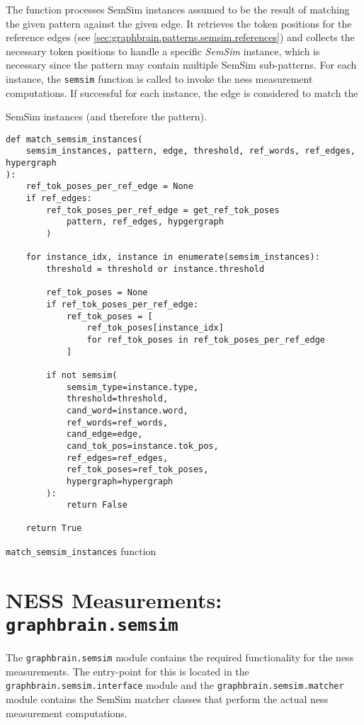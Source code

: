 \documentclass[11pt]{scrreprt}
\begin{document}
The function processes SemSim instances assumed to be the result of matching the given pattern against the given edge. It retrieves the token positions for the reference edges (see \cref{sec:graphbrain.patterns.semsim.references}) and collects the necessary token positions to handle a specific \textit{SemSim} instance, which is necessary since the pattern may contain multiple SemSim  sub-patterns. For each instance, the \texttt{semsim} function is called to invoke the \gls{ness} measurement computations. If successful for each instance, the edge is considered to match the {SemSim instances (and therefore the pattern).
 
\begin{pseudo}
\begin{lstlisting}
def match_semsim_instances(
    semsim_instances, pattern, edge, threshold, ref_words, ref_edges, hypergraph
):
    ref_tok_poses_per_ref_edge = None
    if ref_edges:
        ref_tok_poses_per_ref_edge = get_ref_tok_poses
            pattern, ref_edges, hypgergraph
        ) 
   
    for instance_idx, instance in enumerate(semsim_instances):
        threshold = threshold or instance.threshold

        ref_tok_poses = None
        if ref_tok_poses_per_ref_edge:
            ref_tok_poses = [
                ref_tok_poses[instance_idx]
                for ref_tok_poses in ref_tok_poses_per_ref_edge
            ]

        if not semsim(
            semsim_type=instance.type,
            threshold=threshold,
            cand_word=instance.word,
            ref_words=ref_words,
            cand_edge=edge,
            cand_tok_pos=instance.tok_pos,
            ref_edges=ref_edges,
            ref_tok_poses=ref_tok_poses,
            hypergraph=hypergraph
        ):
            return False

    return True
\end{lstlisting}
\caption{\texttt{match\_semsim\_instances} function}
\label{psd:match-semsim-instancess-function}
\end{pseudo}

 
\section{NESS Measurements: \texttt{graphbrain.semsim}}
The \texttt{graphbrain.semsim} module contains the required functionality for the \gls{ness} measurements. The entry-point for this is located in the \texttt{graphbrain.semsim.interface} module and the \texttt{graphbrain.semsim.matcher} module contains the SemSim matcher classes that perform the actual \gls{ness} measurement computations.


}
\end{document}
